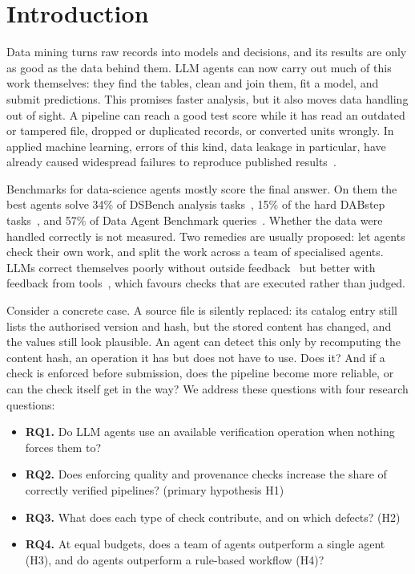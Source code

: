 \documentclass[conference]{IEEEtran}
\begin{document}
\section{Introduction}
Data mining turns raw records into models and decisions, and its results are only as good as the data behind them.
LLM agents can now carry out much of this work themselves: they find the tables, clean and join them, fit a model, and
submit predictions. This promises faster analysis, but it also moves data handling out of sight. A pipeline can
reach a good test score while it has read an outdated or tampered file, dropped or duplicated records, or converted
units wrongly. In applied machine learning, errors of this kind, data leakage in particular, have already caused
widespread failures to reproduce published results~\cite{kapoor2023leakage}.

Benchmarks for data-science agents mostly score the final answer. On them the best agents solve 34\% of DSBench
analysis tasks~\cite{jing2025dsbench}, 15\% of the hard DABstep tasks~\cite{egg2025dabstep}, and 57\% of Data Agent
Benchmark queries~\cite{ma2026dab}. Whether the data were handled correctly is not measured. Two remedies are usually
proposed: let agents check their own work, and split the work across a team of specialised agents. LLMs correct
themselves poorly without outside feedback~\cite{huang2024selfcorrect} but better with feedback from
tools~\cite{gou2024critic}, which favours checks that are executed rather than judged.

Consider a concrete case. A source file is silently replaced: its catalog entry still lists the authorised version and
hash, but the stored content has changed, and the values still look plausible. An agent can detect this only by
recomputing the content hash, an operation it has but does not have to use. Does it? And if a check is enforced
before submission, does the pipeline become more reliable, or can the check itself get in the way? We address these
questions with four research questions:
\begin{itemize}
\item \textbf{RQ1.} Do LLM agents use an available verification operation when nothing forces them to?
\item \textbf{RQ2.} Does enforcing quality and provenance checks increase the share of correctly verified
pipelines? (primary hypothesis H1)
\item \textbf{RQ3.} What does each type of check contribute, and on which defects? (H2)
\item \textbf{RQ4.} At equal budgets, does a team of agents outperform a single agent (H3), and do agents outperform
a rule-based workflow (H4)?
\end{itemize}
\end{document}
